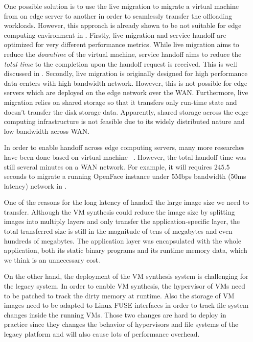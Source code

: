 One possible solution is to use the live migration\cite{vmlivemig} to migrate a virtual machine from on edge server to another in order to seamlessly transfer the offloading workloads. However, this approach is already shown to be not suitable for edge computing environment in  \cite{ha2015vmhandoff}. Firstly, live migration and service handoff are optimized for very different performance metrics. While live migration aims to reduce the \textit{downtime} of the virtual machine, service handoff aims to reduce the \textit{total time} to the completion upon the handoff request is received. This is well discussed in \cite{ha2015vmhandoff}.
Secondly, live migration is originally designed for high performance data centers with high bandwidth network. However, this is not possible for edge servers which are deployed on the edge network over the WAN. Furthermore, live migration relies on shared storage so that it transfers only run-time state and doesn't transfer the disk storage data. Apparently, shared storage across the edge computing infrastructure is not feasible due to its widely distributed nature and low bandwidth across WAN. 

In order to enable handoff across edge computing servers, many more researches have been done based on virtual machine ~\cite{satya2009case,ha2015vmhandoff}. 
However, the total handoff time was still several minutes on a WAN network. For example, it will requires $245.5$ seconds to migrate a running OpenFace instance under 5Mbps bandwidth (50ms latency) network in \cite{ha2015vmhandoff}. 

One of the reasons for the long latency of handoff the large image size we need to transfer. Although the VM synthesis could reduce the image size by splitting images into multiply layers and only transfer the application-specific layer, the total transferred size is still in the magnitude of tens of megabytes and even hundreds of megabytes. 
The application layer was encapsulated with the whole application, both its static binary programs and its runtime memory data, which we think is an unnecessary cost. 

On the other hand, the deployment of the VM synthesis system is challenging for the legacy system. In order to enable VM synthesis, the hypervisor of VMs need to be patched to track the dirty memory at runtime. Also the storage of VM images need to be adapted to Linux FUSE interfaces in order to track file system changes inside the running VMs. Those two changes are hard to deploy in practice since they changes the behavior of hypervisors and file systems of the legacy platform and will also cause lots of performance overhead. 


